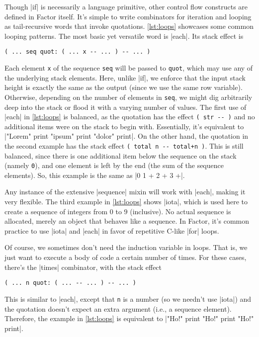 
Though \factor|if| is necessarily a language primitive, other control flow
constructs are defined in Factor itself.  It's simple to write combinators for
iteration and looping as tail-recursive words that invoke quotations.
\vref{lst:loops} showcases some common looping patterns.  The most basic yet
versatile word is \factor|each|.  Its stack effect is
%
\begin{center}
%
  \Verb|( ... seq quot: ( ... x -- ... ) -- ... )|
%
\end{center}
%
\noindent Each element \Verb|x| of the sequence \Verb|seq| will be passed
to \Verb|quot|, which may use any of the underlying stack elements.  Here,
unlike \factor|if|, we enforce that the input stack height is exactly the same
as the output (since we use the same row variable).  Otherwise, depending on
the number of elements in \Verb|seq|, we might dig arbitrarily deep into the
stack or flood it with a varying number of values.  The first use of
\factor|each| in \vref{lst:loops} is balanced, as the quotation has the effect
%
\Verb|( str -- )|
%
and no additional items were on the stack to begin with.  Essentially, it's
equivalent to
%
\factor|"Lorem" print "ipsum" print "dolor" print|.
%
On the other hand, the quotation in the second example has the stack effect
%
\Verb|( total n -- total+n )|.
%
This is still balanced, since there is one additional item below the sequence
on the stack (namely \Verb|0|), and one element is left by the end (the sum
of the sequence elements).  So, this example is the same as
%
\factor|0 1 + 2 + 3 +|.

Any instance of the extensive \factor|sequence| mixin will work with
\factor|each|, making it very flexible.  The third example in \vref{lst:loops}
shows \factor|iota|, which is used here to create a  sequence of
integers from $0$ to $9$ (inclusive).  No actual sequence is allocated, merely
an object that behaves like a sequence.  In Factor, it's common practice to use
\factor|iota| and \factor|each| in favor of repetitive C-like |for|
loops.

Of course, we sometimes don't need the induction variable in loops.  That is,
we just want to execute a body of code a certain number of times.  For these
cases, there's the \factor|times| combinator, with the stack effect
%
\begin{center}
%
  \Verb|( ... n quot: ( ... -- ... ) -- ... )|
%
\end{center}
%
\noindent This is similar to \factor|each|, except that \Verb|n| is a number
(so we needn't use \factor|iota|) and the quotation doesn't expect an extra
argument (i.e., a sequence element).  Therefore, the example in
\vref{lst:loops} is equivalent to
%
\factor|"Ho!" print "Ho!" print "Ho!" print|.
%

